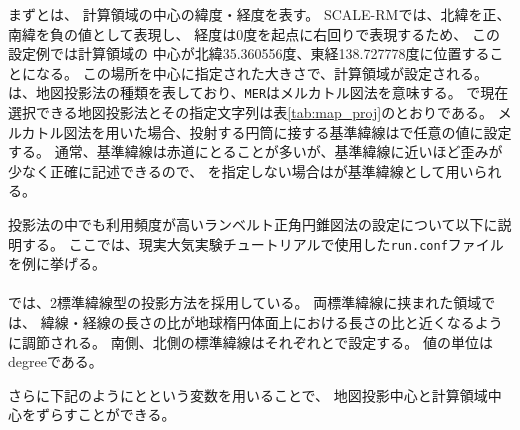 \noindent
まずとは、
計算領域の中心の緯度・経度を表す。
SCALE-RMでは、北緯を正、南緯を負の値として表現し、
経度は0度を起点に右回りで表現するため、
この設定例では計算領域の
中心が北緯35.360556度、東経138.727778度に位置することになる。
この場所を中心に指定された大きさで、計算領域が設定される。\\
は、地図投影法の種類を表しており、\verb|MER|はメルカトル図法を意味する。
\scalerm で現在選択できる地図投影法とその指定文字列は表\ref{tab:map_proj}のとおりである。
メルカトル図法を用いた場合、投射する円筒に接する基準緯線はで任意の値に設定する。
通常、基準緯線は赤道にとることが多いが、基準緯線に近いほど歪みが少なく正確に記述できるので、
を指定しない場合はが基準緯線として用いられる。

投影法の中でも利用頻度が高いランベルト正角円錐図法の設定について以下に説明する。
ここでは、現実大気実験チュートリアルで使用した\verb|run.conf|ファイルを例に挙げる。\\

{\small {\gt
{}}}\\

\noindent
\scalerm では、2標準緯線型の投影方法を採用している。
両標準緯線に挟まれた領域では、
緯線・経線の長さの比が地球楕円体面上における長さの比と近くなるように調節される。
南側、北側の標準緯線はそれぞれとで設定する。
値の単位はdegreeである。

さらに下記のようにとという変数を用いることで、
地図投影中心と計算領域中心をずらすことができる。\\~\\

